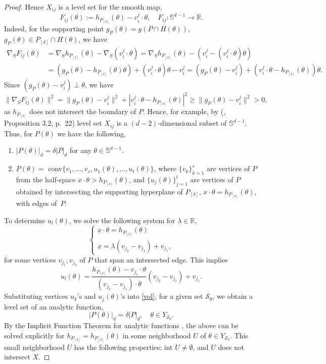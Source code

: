 \documentclass[12pt,letterpaper,reqno]{amsart}
\begin{document}
\begin{proof}
Hence $X_{ij}$ is a level set for the smooth map,
$$
F_{ij}(\theta):=h_{P_{[\delta]}}(\theta)-v_i^j\cdot  \theta, \quad F_{ij}: \mathbb{S}^{d-1} \to \mathbb{R}.
$$
Indeed, for the supporting point $g_P(\theta) = g(P \cap H(\theta))$, $g_P(\theta) \in P_{[\delta]} \cap H(\theta)$, we have
\begin{align*}
    \nabla_S F_{ij}(\theta) &= \nabla_S h_{P_{[\delta]}}(\theta) - \nabla_S(v_i^j \cdot \theta) =
    \nabla_S h_{P_{[\delta]}}(\theta) - (v_i^j - (v_i^j \cdot \theta) \theta )\\
    &=(g_P(\theta) - h_{P_{[\delta]}}(\theta) \theta) + (v_i^j \cdot \theta) \theta - v_i^j = (g_P(\theta) - v_i^j) + (v_i^j \cdot \theta - h_{P_{[\delta]}}(\theta) ) \theta.
\end{align*}
Since $(g_P(\theta) - v_i^j) \perp \theta $, we have 
$$
\| \nabla_S F_{ij}(\theta) \|^2 = \|g_P(\theta)-v_i^j\|^2 + |v_i^j \cdot \theta - h_{P_{[\delta]}}(\theta)|^2 \geq \|g_P(\theta)-v_i^j\|^2>0,
$$
as $h_{P_{[\delta]}}$ does not intersect the boundary of $P$.
Hence, for example, by (\cite{Hi}, Proposition 3.2, p.~22) level set $X_{ij}$ is a $(d-2)$-dimensional subset of $\mathbb{S}^{d-1}$.
Thus, for $P(\theta)$ we have the following,
\begin{enumerate}
    \item $|P(\theta)|_d = \delta|P|_d$ for any $\theta \in \mathbb{S}^{d-1}$.
    \item $P(\theta) =$ conv$\{v_1, \ldots, v_s, u_1(\theta), \ldots, u_t(\theta)\}$, where $\{v_k\}_{k=1}^s$ are vertices of $P$ from the half-space $x \cdot \theta > h_{P_{[\delta]} }(\theta)$, and $\{u_j(\theta)\}_{j=1}^t$ are vertices of $P$ obtained by intersecting the supporting hyperplane of $P_{[\delta]}$, $x \cdot \theta = h_{P_{[\delta]}}(\theta)$, with edges of~$P$.
\end{enumerate}
To determine $u_l(\theta)$, we solve the following system for $\lambda \in \mathbb{R}$,
$$
\begin{cases}
    x \cdot \theta = h_{P_{[\delta]}}(\theta)\\
    x = \lambda (v_{j_2} - v_{j_1}) + v_{j_1},
\end{cases}
$$
for some vertices $v_{j_1}, v_{j_2}$ of $P$ that span an intersected edge. This implies
$$
u_l(\theta) = \frac{h_{P_{[\delta]}}(\theta) - v_{j_1} \cdot \theta }{(v_{j_2} - v_{j_1})\cdot \theta} (v_{j_2} - v_{j_1}) + v_{j_1}.
$$
Substituting vertices $u_k$'s and $u_j(\theta)$'s into \eqref{vol}, for a given set $\mathcal{S}_\theta$, we obtain a level set of an analytic function,
$$
|P(\theta)|_d = \delta |P|_d, \quad \theta \in Y_\mathcal{S_\theta}.
$$
By the Implicit Function Theorem for analytic functions \cite{KP}, the above can be solved explicitly for $h_{P_{[\delta]}}=h_{P_{[\delta]}}(\theta)$ in some neighborhood $U$ of $\theta \in Y_\mathcal{S_\theta}$. 
This small neighborhood $U$ has the following properties: int $U \neq \emptyset$, and $U$ does not intersect $X$.


\end{proof}
\end{document}
